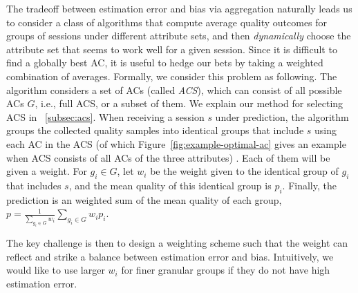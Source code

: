\label{subsec:basic}
The tradeoff between estimation error and bias via aggregation naturally leads us to consider a class of algorithms that compute average quality outcomes for groups of sessions under different attribute sets, and then {\it dynamically} choose the attribute set that seems to work well for a given session.  Since it is difficult to find a globally best AC, it is useful to hedge our bets by taking a weighted combination of averages.  
Formally, we consider this problem as following. The algorithm considers a set of ACs (called {\it ACS}), which can consist of all possible ACs $G$, i.e., full ACS, or a subset of them. We explain our method for selecting ACS in \Section~\ref{subsec:acs}. When receiving a session $s$ under prediction, the algorithm groups the collected quality samples into identical groups that include $s$ using each AC in the ACS (of which Figure~\ref{fig:example-optimal-ac} gives an example when ACS consists of all ACs of the three attributes) . Each of them will be given a weight. For $g_i\in G$, let $w_i$ be the weight given to the identical group of $g_i$ that includes $s$, and the mean quality of this identical group is $p_i$. 
Finally, the prediction is an weighted sum of the mean quality of each group, $p=\frac{1}{\sum_{g_i\in G} w_i}\sum_{g_i\in G} w_ip_i$.

The key challenge is then to design a weighting scheme such that the weight can reflect and strike a balance between estimation error and bias. Intuitively, we would like to use larger $w_i$ for finer granular groups if they do not have high estimation error. 


